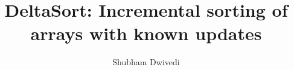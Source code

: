 \documentclass[a4paper,UKenglish,cleveref,autoref,thm-restate]{lipics-v2021}
\title{DeltaSort: Incremental sorting of arrays with known updates}
\author{Shubham Dwivedi}{Independent Researcher, India}{shubd3@gmail.com}{https://orcid.org/0009-0005-7988-8923}{}
\begin{document}
\maketitle
\begin{abstract}

\end{abstract}










\end{document}
